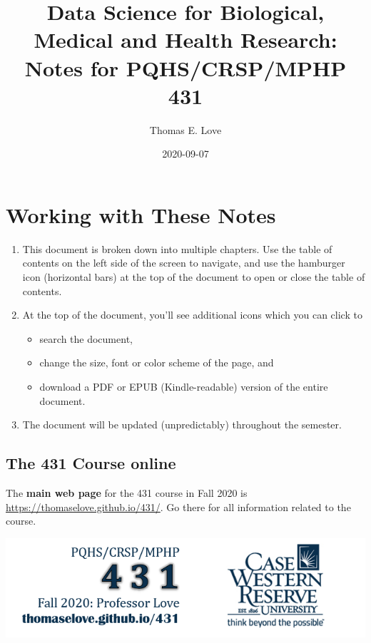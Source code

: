 \documentclass[
]{book}
\title{Data Science for Biological, Medical and Health Research: Notes for PQHS/CRSP/MPHP 431}
\author{Thomas E. Love}
\date{2020-09-07}
\providecommand{\tightlist}{%
  \setlength{\itemsep}{0pt}\setlength{\parskip}{0pt}}
\begin{document}
\maketitle

{
\setcounter{tocdepth}{1}
\tableofcontents
}
\hypertarget{working-with-these-notes}{%
\chapter*{Working with These Notes}\label{working-with-these-notes}}

\begin{enumerate}
\def\labelenumi{\arabic{enumi}.}
\tightlist
\item
  This document is broken down into multiple chapters. Use the table of contents on the left side of the screen to navigate, and use the hamburger icon (horizontal bars) at the top of the document to open or close the table of contents.
\item
  At the top of the document, you'll see additional icons which you can click to

  \begin{itemize}
  \tightlist
  \item
    search the document,
  \item
    change the size, font or color scheme of the page, and
  \item
    download a PDF or EPUB (Kindle-readable) version of the entire document.
  \end{itemize}
\item
  The document will be updated (unpredictably) throughout the semester.
\end{enumerate}

\hypertarget{the-431-course-online}{%
\section*{The 431 Course online}\label{the-431-course-online}}

The \textbf{main web page} for the 431 course in Fall 2020 is \url{https://thomaselove.github.io/431/}. Go there for all information related to the course.

\begin{center}\includegraphics[width=0.8\linewidth]{figures/431_foot2} \end{center}
\end{document}
